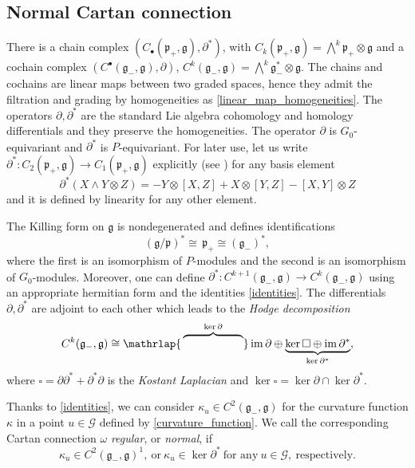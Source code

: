 \documentclass{amsart}
\theoremstyle{plain}
\theoremstyle{definition}
\theoremstyle{remark}
\newcommand{\mc}[1]{\mathcal{#1}}
\newcommand{\mfk}[1]{\mathfrak{#1}}
\newcommand{\on}[1]{\operatorname{#1}}
\begin{document}
\subsection{Normal Cartan connection}
There is a chain complex
$ \left( C_\bullet (\mfk{p}_+,\mfk{g}), \partial^* \right)$, with $C_k (\mfk{p}_+,\mfk{g}) = \bigwedge^k \mfk{p}_+ \otimes \mfk{g}$
and a cochain complex
$\left( C^\bullet (\mfk{g}_-,\mfk{g}), \partial \right)$, $C^k (\mfk{g}_-,\mfk{g}) = \bigwedge^k \mfk{g}_-^* \otimes \mfk{g}$.
The chains and cochains are linear maps between two graded spaces, hence they admit the filtration and grading by homogeneities as \eqref{linear_map_homogeneities}. The operators $\partial, \partial^*$ are the standard Lie algebra cohomology and homology differentials and they preserve the homogeneities. The operator $\partial$ is $G_0$-equivariant and $\partial^*$ is $P$-equivariant. For later use, let us write $\partial^* \colon C_2(\mfk{p}_+,\mfk{g}) \to C_1 (\mfk{p}_+, \mfk{g})$ explicitly (see \cite[p.~6]{dt2022}) for any basis element
\begin{equation}\label{del_star}
    \partial^*(X \wedge Y \otimes Z) = -Y \otimes [X,Z] + X \otimes [Y,Z] - [X,Y] \otimes Z
\end{equation}
and it is defined by linearity for any other element.

The Killing form on $\mfk{g}$ is nondegenerated and defines identifications
\begin{equation}\label{identities}
   (\mfk{g}/\mfk{p})^* \cong \,\mfk{p}_+ \cong (\mfk{g}_-)^*,
\end{equation}
where the first is an isomorphism of $P$-modules and the second is an isomorphism of $G_0$-modules. Moreover, one can define $\partial^*\colon C^{k+1} (\mfk{g}_-,\mfk{g}) \to C^{k} (\mfk{g}_-,\mfk{g})$ using an appropriate hermitian form and the identities \eqref{identities}. The differentials $\partial, \partial^*$ are adjoint to each other which leads to the \emph{Hodge decomposition}
%
\begin{equation}\label{hodge_decomposition}
    C^k(\mfk{g}_-, \mfk{g}) \cong \mathrlap{\,\overbrace{\phantom{\on{im} \partial \oplus \ker \square}}^{\ker \partial}} \on{im} \partial \oplus \underbrace{\ker \square \oplus \on{im} \partial^*}_{\ker \partial^*},
\end{equation}
%
where $\square = \partial \partial^* + \partial^* \partial$ is the \emph{Kostant Laplacian} and $\ker \square = \ker \partial \cap \ker \partial^*$.

Thanks to \eqref{identities}, we can consider $\kappa_u \in C^2 (\mfk{g}_-,\mfk{g})$ for the curvature function $\kappa$ in a point $u \in \mc{G}$ defined by \eqref{curvature_function}. We call the corresponding Cartan connection $\omega$ \emph{regular}, or \emph{normal}, if
\begin{equation} \label{Cc_regular_normal}
    \kappa_u \in C^2 (\mfk{g}_-, \mfk{g})^1,\ \text{or}\ \kappa_u \in {\ker \partial^*}\ \text{for any}\ u \in \mc{G},\ \text{respectively}.
\end{equation}
\end{document}
